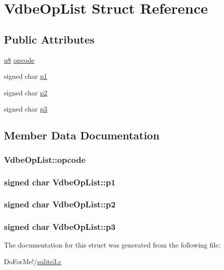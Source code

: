 \hypertarget{struct_vdbe_op_list}{\section{Vdbe\-Op\-List Struct Reference}
\label{struct_vdbe_op_list}
}
\subsection*{Public Attributes}
\begin{DoxyCompactItemize}
\item 
\hyperlink{sqlite3_8c_a74a0f6424ae628af25f23f0a35f6ead3}{u8} \hyperlink{struct_vdbe_op_list_a9c839a619aed99f91cb5e226487be7be}{opcode}
\item 
signed char \hyperlink{struct_vdbe_op_list_a68641ef4313dfdfafe45b75203c49d5a}{p1}
\item 
signed char \hyperlink{struct_vdbe_op_list_a8493431402f7f91cea81c00e311dc4e1}{p2}
\item 
signed char \hyperlink{struct_vdbe_op_list_a584cdaa02042fd5d1bc8cffbdfd9441d}{p3}
\end{DoxyCompactItemize}


\subsection{Member Data Documentation}
\hypertarget{struct_vdbe_op_list_a9c839a619aed99f91cb5e226487be7be}{
\subsubsection[{opcode}]{ Vdbe\-Op\-List\-::opcode}}\label{struct_vdbe_op_list_a9c839a619aed99f91cb5e226487be7be}
\hypertarget{struct_vdbe_op_list_a68641ef4313dfdfafe45b75203c49d5a}{
\subsubsection[{p1}]{\setlength{\rightskip}{0pt plus 5cm}signed char Vdbe\-Op\-List\-::p1}}\label{struct_vdbe_op_list_a68641ef4313dfdfafe45b75203c49d5a}
\hypertarget{struct_vdbe_op_list_a8493431402f7f91cea81c00e311dc4e1}{
\subsubsection[{p2}]{\setlength{\rightskip}{0pt plus 5cm}signed char Vdbe\-Op\-List\-::p2}}\label{struct_vdbe_op_list_a8493431402f7f91cea81c00e311dc4e1}
\hypertarget{struct_vdbe_op_list_a584cdaa02042fd5d1bc8cffbdfd9441d}{
\subsubsection[{p3}]{\setlength{\rightskip}{0pt plus 5cm}signed char Vdbe\-Op\-List\-::p3}}\label{struct_vdbe_op_list_a584cdaa02042fd5d1bc8cffbdfd9441d}


The documentation for this struct was generated from the following file\-:\begin{DoxyCompactItemize}
\item 
Do\-For\-Me!/\hyperlink{sqlite3_8c}{sqlite3.\-c}\end{DoxyCompactItemize}
